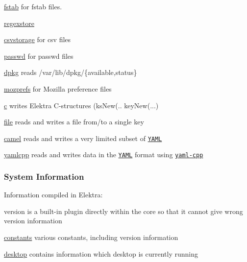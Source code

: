 \begin{DoxyItemize}
\item \hyperlink{md_src_plugins_fstab_README_src_plugins_fstab_README_md}{fstab} for fstab files.
\item \hyperlink{md_src_plugins_regexstore_README_src_plugins_regexstore_README_md}{regexstore}
\item \hyperlink{md_src_plugins_csvstorage_README_src_plugins_csvstorage_README_md}{csvstorage} for csv files
\item \hyperlink{md_src_plugins_passwd_README_src_plugins_passwd_README_md}{passwd} for passwd files
\item \hyperlink{md_src_plugins_dpkg_README_src_plugins_dpkg_README_md}{dpkg} reads /var/lib/dpkg/\{available,status\}
\item \hyperlink{md_src_plugins_mozprefs_README_src_plugins_mozprefs_README_md}{mozprefs} for Mozilla preference files
\item \hyperlink{md_src_plugins_c_README_src_plugins_c_README_md}{c} writes Elektra C-\/structures ({\ttfamily ks\+New(.. key\+New(...})
\item \hyperlink{md_src_plugins_file_README_src_plugins_file_README_md}{file} reads and writes a file from/to a single key
\item \hyperlink{md_src_plugins_camel_README_src_plugins_camel_README_md}{camel} reads and writes a very limited subset of \href{http://www.yaml.org}{\tt Y\+A\+ML}
\item \hyperlink{md_src_plugins_yamlcpp_README_src_plugins_yamlcpp_README_md}{yamlcpp} reads and writes data in the \href{http://www.yaml.org}{\tt Y\+A\+ML} format using \href{https://github.com/jbeder/yaml-cpp}{\tt yaml-\/cpp}
\end{DoxyItemize}

\subsubsection*{System Information}

Information compiled in Elektra\+:
\begin{DoxyItemize}
\item version is a built-\/in plugin directly within the core so that it cannot give wrong version information
\item \hyperlink{md_src_plugins_constants_README_src_plugins_constants_README_md}{constants} various constants, including version information
\item \hyperlink{md_src_plugins_desktop_README_src_plugins_desktop_README_md}{desktop} contains information which desktop is currently running
\end{DoxyItemize}

